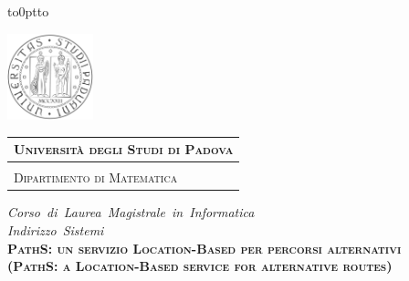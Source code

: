 \documentclass[a4paper, 12pt, twoside, openright]{book}
\begin{document}
\frontmatter

\begin{titlepage} %
\begin{center}
\vbox to0pt{\vbox to\vss}

\hspace{0.5cm}
\begin{minipage}{.20\textwidth}
  \includegraphics[height=2.5cm]{unipd-bn.png}
\end{minipage}\begin{minipage}{.90\textwidth}
  \begin{table}[H]
  \begin{tabular}{l}
  \scshape{\Large{\bfseries{Università degli Studi di Padova}}} \\
  \hline \\
  \scshape{\Large{Dipartimento di Matematica}} \\
  \end{tabular}
  \end{table}
\end{minipage}

\vspace{1cm}
\emph{\Large{Corso~di~Laurea~Magistrale~in~Informatica}} \\
\vspace{0.5cm}
\emph{\Large{Indirizzo~Sistemi}} \\
\vspace{1.5cm}
\scshape{\Large{\bfseries{PathS: un servizio Location-Based per percorsi alternativi}}} \\
\vspace{0.2cm} \linespread{1} \scshape{\large{\bfseries{(PathS: a Location-Based service for alternative routes)}}}
\end{center}


\end{titlepage}
\end{document}
